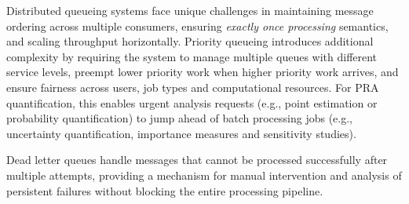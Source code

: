 % 


Distributed queueing systems face unique challenges in maintaining message ordering across multiple consumers, ensuring \textit{exactly once processing} semantics, and scaling throughput horizontally. Priority queueing introduces additional complexity by requiring the system to manage multiple queues with different service levels, preempt lower priority work when higher priority work arrives, and ensure fairness across users, job types and computational resources. For PRA quantification, this enables urgent analysis requests (e.g., point estimation or probability quantification) to jump ahead of batch processing jobs (e.g., uncertainty quantification, importance measures and sensitivity studies).

Dead letter queues handle messages that cannot be processed successfully after multiple attempts, providing a mechanism for manual intervention and analysis of persistent failures without blocking the entire processing pipeline.





